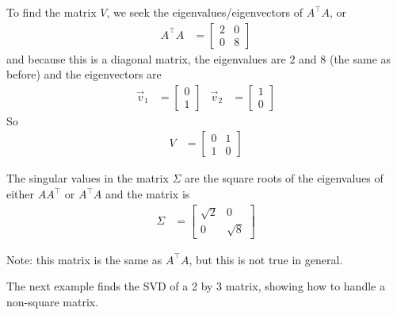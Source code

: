 \begin{example}
To find the matrix $V$, we seek the eigenvalues/eigenvectors of $A^{\intercal}A$, or 
\begin{align*}
A^{\intercal} A & = \begin{bmatrix}
2 & 0 \\ 0 & 8 
\end{bmatrix}
\end{align*}
and because this is a diagonal matrix, the eigenvalues are $2$ and $8$ (the same as before) and the eigenvectors are
\begin{align*}
\vec{v}_1 & = \begin{bmatrix}
0 \\ 1
\end{bmatrix} & \vec{v}_2 & = \begin{bmatrix}
1 \\ 0 
\end{bmatrix}
\end{align*}
So 
\begin{align*}
V & = \begin{bmatrix}
0 & 1 \\
1 & 0 
\end{bmatrix}
\end{align*}

The singular values in the matrix $\Sigma$ are the square roots of the eigenvalues of either $AA^{\intercal}$ or $A^{\intercal}A$ and the matrix is
\begin{align*}
\Sigma & = \begin{bmatrix}
\sqrt{2} & 0 \\
0 & \sqrt{8} 
\end{bmatrix}
\end{align*}

Note:  this matrix is the same as $A^{\intercal}A$, but this is not true in general.  

\end{example}


The next example finds the SVD of a 2 by 3 matrix, showing how to handle a non-square matrix. 

